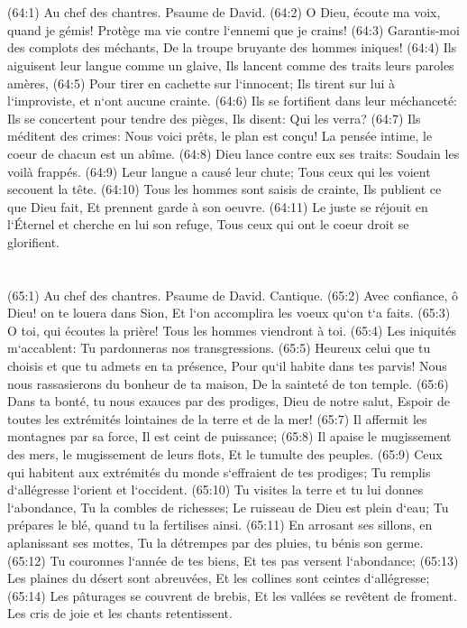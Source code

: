 \chapter{}

\verse (64:1) Au chef des chantres. Psaume de David. (64:2) O Dieu, écoute ma voix, quand je gémis! Protège ma vie contre l`ennemi que je crains! 
\verse (64:3) Garantis-moi des complots des méchants, De la troupe bruyante des hommes iniques! 
\verse (64:4) Ils aiguisent leur langue comme un glaive, Ils lancent comme des traits leurs paroles amères, 
\verse (64:5) Pour tirer en cachette sur l`innocent; Ils tirent sur lui à l`improviste, et n`ont aucune crainte. 
\verse (64:6) Ils se fortifient dans leur méchanceté: Ils se concertent pour tendre des pièges, Ils disent: Qui les verra? 
\verse (64:7) Ils méditent des crimes: Nous voici prêts, le plan est conçu! La pensée intime, le coeur de chacun est un abîme. 
\verse (64:8) Dieu lance contre eux ses traits: Soudain les voilà frappés. 
\verse (64:9) Leur langue a causé leur chute; Tous ceux qui les voient secouent la tête. 
\verse (64:10) Tous les hommes sont saisis de crainte, Ils publient ce que Dieu fait, Et prennent garde à son oeuvre. 
\verse (64:11) Le juste se réjouit en l`Éternel et cherche en lui son refuge, Tous ceux qui ont le coeur droit se glorifient. 

\chapter{}

\verse (65:1) Au chef des chantres. Psaume de David. Cantique. (65:2) Avec confiance, ô Dieu! on te louera dans Sion, Et l`on accomplira les voeux qu`on t`a faits. 
\verse (65:3) O toi, qui écoutes la prière! Tous les hommes viendront à toi. 
\verse (65:4) Les iniquités m`accablent: Tu pardonneras nos transgressions. 
\verse (65:5) Heureux celui que tu choisis et que tu admets en ta présence, Pour qu`il habite dans tes parvis! Nous nous rassasierons du bonheur de ta maison, De la sainteté de ton temple. 
\verse (65:6) Dans ta bonté, tu nous exauces par des prodiges, Dieu de notre salut, Espoir de toutes les extrémités lointaines de la terre et de la mer! 
\verse (65:7) Il affermit les montagnes par sa force, Il est ceint de puissance; 
\verse (65:8) Il apaise le mugissement des mers, le mugissement de leurs flots, Et le tumulte des peuples. 
\verse (65:9) Ceux qui habitent aux extrémités du monde s`effraient de tes prodiges; Tu remplis d`allégresse l`orient et l`occident. 
\verse (65:10) Tu visites la terre et tu lui donnes l`abondance, Tu la combles de richesses; Le ruisseau de Dieu est plein d`eau; Tu prépares le blé, quand tu la fertilises ainsi. 
\verse (65:11) En arrosant ses sillons, en aplanissant ses mottes, Tu la détrempes par des pluies, tu bénis son germe. 
\verse (65:12) Tu couronnes l`année de tes biens, Et tes pas versent l`abondance; 
\verse (65:13) Les plaines du désert sont abreuvées, Et les collines sont ceintes d`allégresse; 
\verse (65:14) Les pâturages se couvrent de brebis, Et les vallées se revêtent de froment. Les cris de joie et les chants retentissent. 

